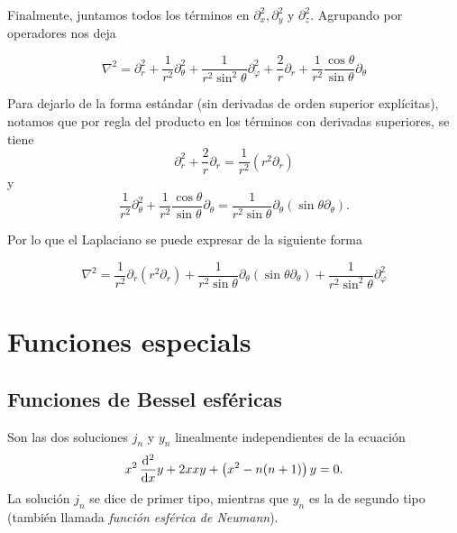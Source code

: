 \documentclass[11pt]{article}
\numberwithin{equation}{section}
\let\d\relax
\newcommand{\d}[1]{\,\frac{\mathrm{d}}{\mathrm{d}#1}}
\newcommand{\dd}[1]{\,\frac{\mathrm{d}^2}{\mathrm{d}#1}}
\begin{document}
Finalmente, juntamos todos los términos en \(\partial^2_x, \partial^2_y\) y
\(\partial^2_z\). Agrupando por operadores nos deja

\begin{equation}
\label{eq:laplaciano_esfericas_v1}
	\nabla^2
	=
	\partial^2_r
	+
	\frac{1}{r^2}
	\partial^2_{\theta}
	+
	\frac{1}{r^2 \sin^2\theta}
	\partial^2_{\varphi}
	+
	\frac{2}{r}
	\partial_{r}
	+
	\frac{1}{r^2} \frac{\cos\theta}{\sin\theta}
	\partial_{\theta}
\end{equation}

Para dejarlo de la forma estándar (sin derivadas de orden superior explícitas),
notamos que por regla del producto en los términos con derivadas superiores,
se tiene
\begin{equation}
	\partial^2_r + \frac{2}{r} \partial_{r}
	=
	\frac{1}{r^2} \left(r^2 \partial_{r}\right)
\end{equation}
y
\begin{equation}
	\frac{1}{r^2} \partial^2_{\theta} + \frac{1}{r^2} \frac{\cos\theta}{\sin\theta} \partial_{\theta}
	=
	\frac{1}{r^2\sin\theta} \partial_{\theta} \left(\sin\theta \partial_{\theta} \right)
.\end{equation}

Por lo que el Laplaciano se puede expresar de la siguiente forma

\begin{equation}
\label{eq:laplaciano_esfericas_v2}
	\nabla^2
	=
	\frac{1}{r^2} \partial_{r} \left(r^2 \partial_{r} \right)
	+
	\frac{1}{r^2\sin\theta} \partial_{\theta} \left(\sin\theta \partial_{\theta} \right)
	+
	\frac{1}{r^2\sin^2\theta} \partial^2_{\varphi}
\end{equation}

\section{Funciones especials}\label{ap:fn especiales}

\subsection{Funciones de Bessel esféricas}%
\label{ap:funciones especiales:bessel}

Son las dos soluciones \(j_n\) y \(y_n\) linealmente independientes de la ecuación
\begin{displaymath}
\label{eq:bessel:esfericas}
	x^2 \dd{x} y + 2x \d{x} y + \left(x^2 - n(n+1)\right) y = 0
.\end{displaymath}
La solución \(j_n\) se dice de primer tipo, mientras que \(y_n\) es la de
segundo tipo (también llamada \textit{función esférica de Neumann}).
\end{document}
